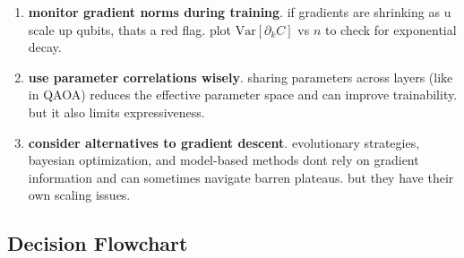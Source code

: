 \documentclass[11pt,a4paper]{article}
\theoremstyle{definition}
\theoremstyle{remark}
\begin{document}
\begin{enumerate}[label=\textbf{G\arabic*.}]
    \item \textbf{monitor gradient norms during training}. if gradients are shrinking as u scale up qubits, thats a red flag. plot $\text{Var}[\partial_k C]$ vs $n$ to check for exponential decay.

    \item \textbf{use parameter correlations wisely}. sharing parameters across layers (like in QAOA) reduces the effective parameter space and can improve trainability. but it also limits expressiveness.

    \item \textbf{consider alternatives to gradient descent}. evolutionary strategies, bayesian optimization, and model-based methods dont rely on gradient information and can sometimes navigate barren plateaus. but they have their own scaling issues.
\end{enumerate}

\subsection{Decision Flowchart}
\end{document}
